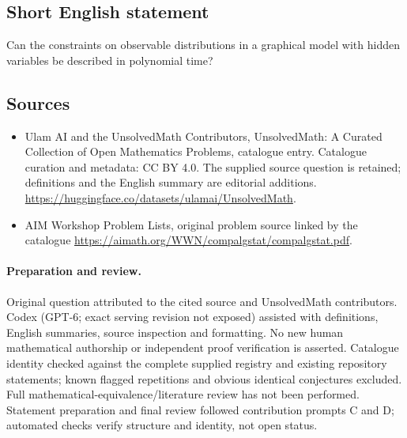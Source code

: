 \documentclass[11pt]{article}
\begin{document}
\subsection{Short English statement}
Can the constraints on observable distributions in a graphical model with hidden variables be described in polynomial time?
\subsection{Sources}
\begin{itemize}
\item[\hypertarget{source:statement:1}{S1}] Ulam AI and the UnsolvedMath Contributors, UnsolvedMath: A Curated Collection of Open Mathematics Problems, catalogue entry. Catalogue curation and metadata: CC BY 4.0. The supplied source question is retained; definitions and the English summary are editorial additions.
\url{https://huggingface.co/datasets/ulamai/UnsolvedMath}.
\item[\hypertarget{source:statement:2}{S2}] AIM Workshop Problem Lists, original problem source linked by the catalogue
\url{https://aimath.org/WWN/compalgstat/compalgstat.pdf}.
\end{itemize}
\paragraph{Preparation and review.}
Original question attributed to the cited source and UnsolvedMath contributors. Codex (GPT-6; exact serving revision not exposed) assisted with definitions, English summaries, source inspection and formatting. No new human mathematical authorship or independent proof verification is asserted. Catalogue identity checked against the complete supplied registry and existing repository statements; known flagged repetitions and obvious identical conjectures excluded. Full mathematical-equivalence/literature review has not been performed. Statement preparation and final review followed contribution prompts C and D; automated checks verify structure and identity, not open status.
\label{end:statement}
\end{document}
